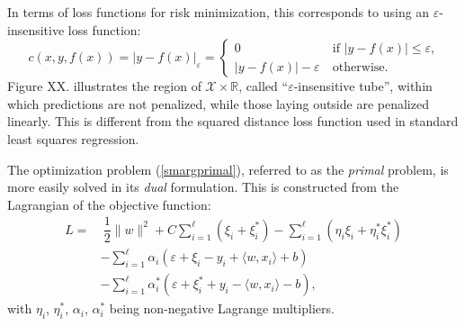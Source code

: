 \documentclass[12pt]{report}
\begin{document}
In terms of loss functions for risk minimization, this corresponds to using an $ \varepsilon $-insensitive loss function:
\begin{equation} \label{epsloss}
c(x,y,f(x)) = \vert y - f(x) \vert_{\varepsilon} = \begin{cases}
0 &\ \text{if } \vert y - f(x) \vert \leq \varepsilon \text{,}\\
\vert y - f(x) \vert - \varepsilon &\ \text{otherwise} \text{.}
\end{cases}
\end{equation}
Figure XX. illustrates the region of $ \mathcal{X} \times \mathbb{R} $, called ``$ \varepsilon $-insensitive tube'', within which predictions are not penalized, while those laying outside are penalized linearly. This is different from the squared distance loss function used in standard least squares regression.

The optimization problem (\ref{smargprimal}), referred to as the \textit{primal} problem, is more easily solved in its \textit{dual} formulation. This is constructed from the Lagrangian of the objective function:
\begin{equation} \label{lagrangian}
\begin{split}
L =& \ \dfrac{1}{2}\| w \|^2 + C\sum_{i=1}^{\ell}(\xi_{i} + \xi_{i}^{*}) - \sum_{i=1}^{\ell}(\eta_{i}\xi_{i} + \eta_{i}^{*}\xi_{i}^{*}) \\
&- \sum_{i=1}^{\ell}\alpha_{i}(\varepsilon + \xi_{i} - y_{i} + \langle w,x_{i} \rangle + b) \\
&- \sum_{i=1}^{\ell}\alpha_{i}^{*}(\varepsilon + \xi_{i}^{*} + y_{i} - \langle w,x_{i} \rangle - b) \text{,}
\end{split}
\end{equation}
with $ \eta_{i} $, $ \eta_{i}^{*} $, $ \alpha_{i} $, $ \alpha_{i}^{*} $ being non-negative Lagrange multipliers.
\end{document}
